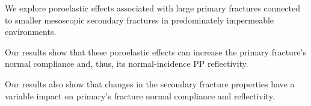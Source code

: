 \documentclass[draft]{agujournal2019}
\begin{document}





\begin{keypoints}
\item We explore poroelastic effects associated with large primary fractures connected to smaller mesoscopic secondary fractures  in predominately impermeable environments.
\item Our results show that these poroelastic effects can increase the primary fracture's normal compliance and, thus, its normal-incidence PP reflectivity.
\item Our results also show that changes in the secondary fracture properties have a variable impact on primary's fracture normal compliance and reflectivity.
\end{keypoints}

%
%

%
%
\end{document}
